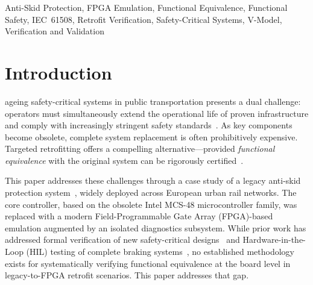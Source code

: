 \documentclass[journal, a4paper]{IEEEtran}
\newif\iffirstFPGA  \firstFPGAtrue
\newcommand{\FPGA}{\iffirstFPGA Field-Programmable Gate Array (FPGA)\global\firstFPGAfalse\else FPGA\fi}
\newif\iffirstSPI   \firstSPItrue
\newif\iffirstHIL   \firstHILtrue
\newcommand{\HIL}{\iffirstHIL Hardware-in-the-Loop (HIL)\global\firstHILfalse\else HIL\fi}
\newif\iffirstPCB   \firstPCBtrue
\newif\iffirstNVRAM \firstNVRAMtrue
\newif\iffirstBOD   \firstBODtrue
\newif\iffirstSIL   \firstSILtrue
\newif\iffirstBCD   \firstBCDtrue
\newif\iffirstSDIO  \firstSDIOtrue
\newif\iffirstRTC   \firstRTCtrue
\newif\iffirstJTAG  \firstJTAGtrue
\newif\iffirstUSB   \firstUSBtrue
\newif\iffirstGPIO  \firstGPIOtrue
\begin{document}
\begin{IEEEkeywords}
Anti-Skid Protection, FPGA Emulation, Functional Equivalence, Functional Safety, IEC~61508, Retrofit Verification, Safety-Critical Systems, V-Model, Verification and Validation
\end{IEEEkeywords}

\global\firstFPGAtrue  \global\firstSPItrue   \global\firstHILtrue
\global\firstPCBtrue   \global\firstNVRAMtrue  \global\firstBODtrue
\global\firstSILtrue   \global\firstBCDtrue   \global\firstSDIOtrue
\global\firstRTCtrue   \global\firstJTAGtrue  \global\firstUSBtrue
\global\firstGPIOtrue

\section{Introduction}
\label{sec:introduction}

\nocite{carbon_infra_uic_2016}%
 ageing safety-critical systems in public transportation presents a dual challenge: operators must simultaneously extend the operational life of proven infrastructure and comply with increasingly stringent safety standards~\cite{losada2021}. As key components become obsolete, complete system replacement is often prohibitively expensive. Targeted retrofitting offers a compelling alternative---provided \textit{functional equivalence} with the original system can be rigorously certified~\cite{guzman2011obsolescence,iec61508_2010}.

This paper addresses these challenges through a case study of a legacy anti-skid protection system~\cite{rexroth1992wsp}, widely deployed across European urban rail networks. The core controller, based on the obsolete Intel MCS-48 microcontroller family, was replaced with a modern \FPGA{}-based emulation augmented by an isolated diagnostics subsystem. While prior work has addressed formal verification of new safety-critical designs~\cite{bozzano2016formal,formal_verification_rail_2023} and \HIL{} testing of complete braking systems~\cite{zhou_wu_2020}, no established methodology exists for systematically verifying functional equivalence at the board level in legacy-to-\FPGA{} retrofit scenarios. This paper addresses that gap.
\end{document}
